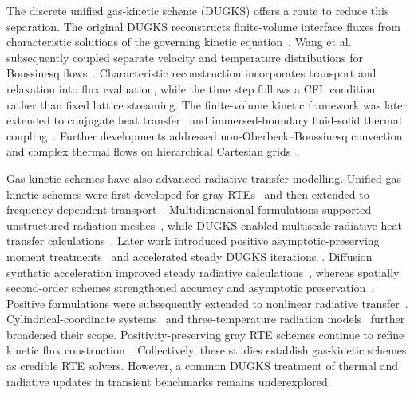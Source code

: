 \documentclass[a4paper,12pt]{ctexart}
\numberwithin{equation}{section}
\begin{document}
The discrete unified gas-kinetic scheme (DUGKS) offers a route to reduce this separation. The original DUGKS reconstructs finite-volume interface fluxes from characteristic solutions of the governing kinetic equation~\cite{Guo2013}. Wang et al. subsequently coupled separate velocity and temperature distributions for Boussinesq flows~\cite{Wang2015}. Characteristic reconstruction incorporates transport and relaxation into flux evaluation, while the time step follows a CFL condition rather than fixed lattice streaming. The finite-volume kinetic framework was later extended to conjugate heat transfer~\cite{Tao2021} and immersed-boundary fluid-solid thermal coupling~\cite{Tao2022}. Further developments addressed non-Oberbeck--Boussinesq convection~\cite{Wen2025} and complex thermal flows on hierarchical Cartesian grids~\cite{Tao2025}.

Gas-kinetic schemes have also advanced radiative-transfer modelling. Unified gas-kinetic schemes were first developed for gray RTEs~\cite{SunJiangXu2015} and then extended to frequency-dependent transport~\cite{Sun2015Frequency}. Multidimensional formulations supported unstructured radiation meshes~\cite{Sun2017}, while DUGKS enabled multiscale radiative heat-transfer calculations~\cite{Luo2018}. Later work introduced positive asymptotic-preserving moment treatments~\cite{Xu2021} and accelerated steady DUGKS iterations~\cite{Song2022}. Diffusion synthetic acceleration improved steady radiative calculations~\cite{Song2023}, whereas spatially second-order schemes strengthened accuracy and asymptotic preservation~\cite{Xu2023}. Positive formulations were subsequently extended to nonlinear radiative transfer~\cite{Xu2024,Song2025}. Cylindrical-coordinate systems~\cite{Wang2025Cyl} and three-temperature radiation models~\cite{Li2025} further broadened their scope. Positivity-preserving gray RTE schemes continue to refine kinetic flux construction~\cite{Wang2026}. Collectively, these studies establish gas-kinetic schemes as credible RTE solvers. However, a common DUGKS treatment of thermal and radiative updates in transient benchmarks remains underexplored.
\end{document}
